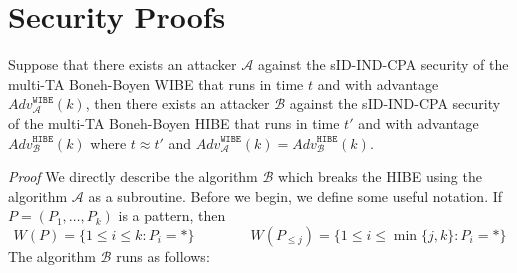 \documentclass[10pt]{llncs}
\newcommand{\A}{\mathcal{A}}
\newcommand{\B}{\mathcal{B}}
\newcommand{\adv}[2]{\mathit{Adv}_{#1}^{\texttt{#2}}}
\begin{document}



\appendix
\section{Security Proofs} \label{app:proof}

\begin{theorem}
Suppose that there exists an attacker $\A$ against the sID-IND-CPA
security of the multi-TA Boneh-Boyen WIBE that runs in time $t$ and
with advantage $\adv{\A}{WIBE}(k)$, then there exists an attacker
$\B$ against the sID-IND-CPA security of the multi-TA Boneh-Boyen
HIBE that runs in time $t'$ and with advantage $\adv{\B}{HIBE}(k)$
where $t \approx t'$ and $\adv{\A}{WIBE}(k) = \adv{\B}{HIBE}(k)$.
\end{theorem}
\emph{Proof} We directly describe the algorithm $\B$ which breaks the
HIBE using the algorithm $\A$ as a subroutine. Before we begin, we
define some useful notation. If $P=(P_{1},\ldots,P_{k})$ is a
pattern, then
\begin{displaymath}
W(P) = \{ 1\leq i\leq k : P_{i} = *\} \qquad \qquad W(P_{\leq j}) =
\{ 1\leq i\leq \min\{j,k\} : P_{i} = *\}
\end{displaymath}
The algorithm $\B$ runs as follows:
\end{document}
